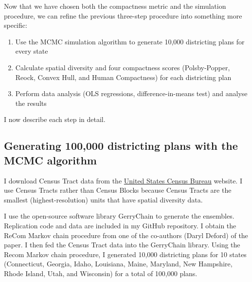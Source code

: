 \documentclass[]{article}
\providecommand{\tightlist}{%
  \setlength{\itemsep}{0pt}\setlength{\parskip}{0pt}}
\begin{document}
Now that we have chosen both the compactness metric and the simulation
procedure, we can refine the previous three-step procedure into
something more specific:

\begin{enumerate}
\def\labelenumi{\arabic{enumi}.}
\tightlist
\item
  Use the MCMC simulation algorithm to generate 10,000 districting plans
  for every state
\item
  Calculate spatial diversity and four compactness scores
  (Polsby-Popper, Reock, Convex Hull, and Human Compactness) for each
  districting plan
\item
  Perform data analysis (OLS regressions, difference-in-means test) and
  analyse the results
\end{enumerate}

I now describe each step in detail.

\hypertarget{generating-100000-districting-plans-with-the-mcmc-algorithm}{%
\subsection{Generating 100,000 districting plans with the MCMC
algorithm}\label{generating-100000-districting-plans-with-the-mcmc-algorithm}}

I download Census Tract data from the \href{census.gov}{United States
Census Bureau} website. I use Census Tracts rather than Census Blocks
because Census Tracts are the smallest (highest-resolution) units that
have spatial diversity data.

I use the open-source software library GerryChain to generate the
ensembles. Replication code and data are included in my GitHub
repository. I obtain the ReCom Markov chain procedure from one of the
co-authors (Daryl Deford) of the \cite{ddj2019recom} paper. I then fed
the Census Tract data into the GerryChain library. Using the Recom
Markov chain procedure, I generated 10,000 districting plans for 10
states (Connecticut, Georgia, Idaho, Louisiana, Maine, Maryland, New
Hampshire, Rhode Island, Utah, and Wisconsin) for a total of 100,000
plans.
\end{document}
